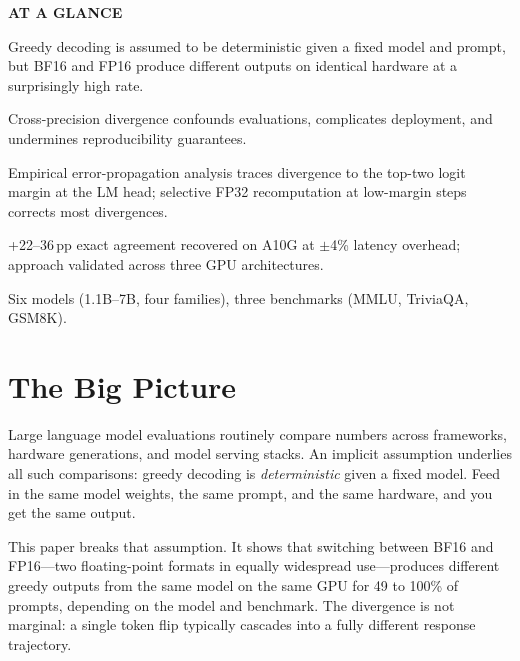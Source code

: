 \documentclass[10pt,twocolumn]{article}
\begin{document}
\begin{mdframed}[backgroundcolor=boxgray,linecolor=rulered,linewidth=1pt,
    innerleftmargin=6pt,innerrightmargin=6pt,
    innertopmargin=6pt,innerbottommargin=6pt]
\textbf{\small AT A GLANCE}\par\vspace{4pt}
\begin{description}[leftmargin=0pt,labelsep=4pt,itemsep=2pt,parsep=0pt,
    font=\small\bfseries]
  \item[Problem:] Greedy decoding is assumed to be deterministic given a
    fixed model and prompt, but BF16 and FP16 produce different outputs
    on identical hardware at a surprisingly high rate.
  \item[Why it matters:] Cross-precision divergence confounds evaluations,
    complicates deployment, and undermines reproducibility guarantees.
  \item[Method:] Empirical error-propagation analysis traces divergence to
    the top-two logit margin at the LM head; selective FP32 recomputation
    at low-margin steps corrects most divergences.
  \item[Result:] +22--36\,pp exact agreement recovered on A10G at $\pm$4\%
    latency overhead; approach validated across three GPU architectures.
  \item[Evidence:] Six models (1.1B--7B, four families), three benchmarks
    (MMLU, TriviaQA, GSM8K).
\end{description}
\end{mdframed}

\section{The Big Picture}

Large language model evaluations routinely compare numbers across
frameworks, hardware generations, and model serving stacks. An implicit
assumption underlies all such comparisons: greedy decoding is
\emph{deterministic} given a fixed model. Feed in the same model weights,
the same prompt, and the same hardware, and you get the same output.

This paper breaks that assumption. It shows that switching between BF16
and FP16---two floating-point formats in equally widespread use---produces
different greedy outputs from the same model on the same GPU for 49 to
100\% of prompts, depending on the model and benchmark. The divergence is
not marginal: a single token flip typically cascades into a fully different
response trajectory.
\end{document}
